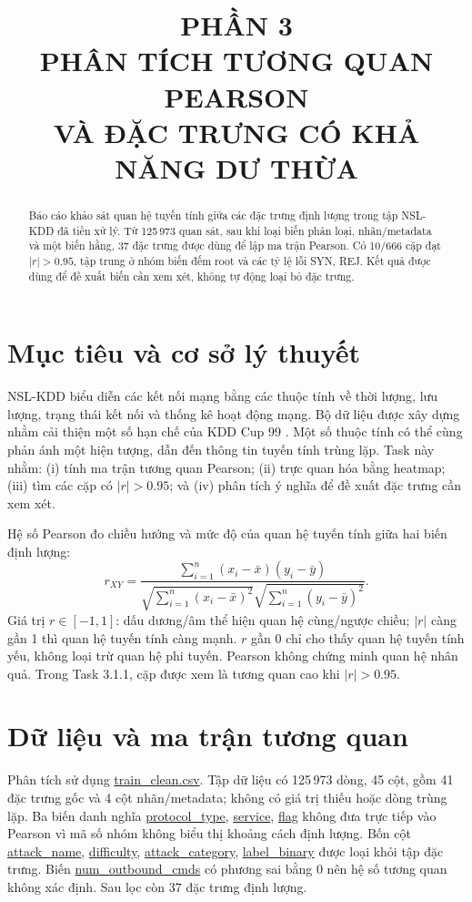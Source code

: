 \documentclass[12pt,a4paper]{article}
\title{\vspace{-1.2em}\textbf{PHẦN 3\\ PHÂN TÍCH TƯƠNG QUAN PEARSON\\
VÀ ĐẶC TRƯNG CÓ KHẢ NĂNG DƯ THỪA}}
\date{}
\begin{document}
\maketitle
\vspace{-2.5cm}

\begin{abstract}
Báo cáo khảo sát quan hệ tuyến tính giữa các đặc trưng định lượng trong tập NSL-KDD đã tiền xử lý. Từ 125\,973 quan sát, sau khi loại biến phân loại, nhãn/metadata và một biến hằng, 37 đặc trưng được dùng để lập ma trận Pearson. Có 10/666 cặp đạt $|r|>0.95$, tập trung ở nhóm biến đếm root và các tỷ lệ lỗi SYN, REJ. Kết quả được dùng để đề xuất biến cần xem xét, không tự động loại bỏ đặc trưng.
\end{abstract}

\section{Mục tiêu và cơ sở lý thuyết}
 
\hspace{0.4cm} NSL-KDD biểu diễn các kết nối mạng bằng các thuộc tính về thời lượng, lưu lượng, trạng thái kết nối và thống kê hoạt động mạng. Bộ dữ liệu được xây dựng nhằm cải thiện một số hạn chế của KDD Cup 99 \parencite{tavallaee2009}. Một số thuộc tính có thể cùng phản ánh một hiện tượng, dẫn đến thông tin tuyến tính trùng lặp. Task này nhằm: (i) tính ma trận tương quan Pearson; (ii) trực quan hóa bằng heatmap; (iii) tìm các cặp có $|r|>0.95$; và (iv) phân tích ý nghĩa để đề xuất đặc trưng cần xem xét.

Hệ số Pearson đo chiều hướng và mức độ của quan hệ tuyến tính giữa hai biến định lượng:
\[
r_{XY}=
\frac{\sum_{i=1}^{n}(x_i-\bar{x})(y_i-\bar{y})}
{\sqrt{\sum_{i=1}^{n}(x_i-\bar{x})^2}
 \sqrt{\sum_{i=1}^{n}(y_i-\bar{y})^2}}.
\]
\hspace{0.4cm} Giá trị $r\in[-1,1]$: dấu dương/âm thể hiện quan hệ cùng/ngược chiều; $|r|$ càng gần 1 thì quan hệ tuyến tính càng mạnh. $r$ gần 0 chỉ cho thấy quan hệ tuyến tính yếu, không loại trừ quan hệ phi tuyến. Pearson không chứng minh quan hệ nhân quả. Trong Task 3.1.1, cặp được xem là tương quan cao khi $|r|>0.95$.

\section{Dữ liệu và ma trận tương quan}
 

\hspace{0.4cm} Phân tích sử dụng \url{train_clean.csv}. Tập dữ liệu có 125\,973 dòng, 45 cột, gồm 41 đặc trưng gốc và 4 cột nhãn/metadata; không có giá trị thiếu hoặc dòng trùng lặp. Ba biến danh nghĩa \url{protocol_type}, \url{service}, \url{flag} không đưa trực tiếp vào Pearson vì mã số nhóm không biểu thị khoảng cách định lượng. Bốn cột \url{attack_name}, \url{difficulty}, \url{attack_category}, \url{label_binary} được loại khỏi tập đặc trưng. Biến \url{num_outbound_cmds} có phương sai bằng 0 nên hệ số tương quan không xác định. Sau lọc còn 37 đặc trưng định lượng.
\end{document}
